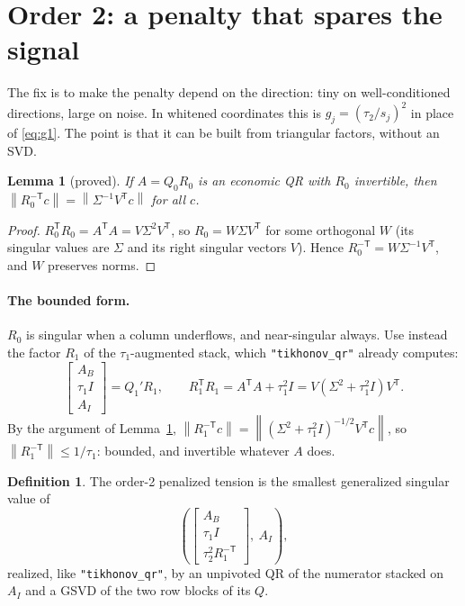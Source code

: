 \documentclass[11pt]{article}
\newtheorem{lemma}{Lemma}
\theoremstyle{definition}
\newtheorem{definition}{Definition}
\theoremstyle{remark}
\newcommand{\code}[1]{\texttt{#1}}
\newcommand{\norm}[1]{\left\lVert #1 \right\rVert}
\newcommand{\AB}{A_B}
\newcommand{\AI}{A_I}
\begin{document}
\section{Order 2: a penalty that spares the signal}

The fix is to make the penalty depend on the direction: tiny on well-conditioned directions,
large on noise. In whitened coordinates this is $g_j = (\tau_2/s_j)^2$ in place of
\eqref{eq:g1}. The point is that it can be built from triangular factors, without an SVD.

\begin{lemma}[proved]\label{lem:rinvt}
If $A = Q_0R_0$ is an economic QR with $R_0$ invertible, then
$\norm{R_0^{-\mathsf T}c} = \norm{\Sigma^{-1}V^{\mathsf T}c}$ for all $c$.
\end{lemma}
\begin{proof}
$R_0^{\mathsf T}R_0 = A^{\mathsf T}A = V\Sigma^2V^{\mathsf T}$, so $R_0 = W\Sigma V^{\mathsf T}$ for
some orthogonal $W$ (its singular values are $\Sigma$ and its right singular vectors $V$). Hence
$R_0^{-\mathsf T} = W\Sigma^{-1}V^{\mathsf T}$, and $W$ preserves norms.
\end{proof}

\paragraph{The bounded form.} $R_0$ is singular when a column underflows, and near-singular
always. Use instead the factor $R_1$ of the $\tau_1$-augmented stack, which \code{"tikhonov\_qr"}
already computes:
\[
  \begin{bmatrix}\AB\\ \tau_1 I\\ \AI\end{bmatrix} = Q_1'R_1,\qquad
  R_1^{\mathsf T}R_1 = A^{\mathsf T}A + \tau_1^2 I = V(\Sigma^2 + \tau_1^2 I)V^{\mathsf T}.
\]
By the argument of Lemma~\ref{lem:rinvt},
$\norm{R_1^{-\mathsf T}c} = \norm{(\Sigma^2+\tau_1^2I)^{-1/2}V^{\mathsf T}c}$, so
$\norm{R_1^{-\mathsf T}}\le 1/\tau_1$: bounded, and invertible whatever $A$ does.

\begin{definition}
The order-2 penalized tension is the smallest generalized singular value of
\begin{equation}\label{eq:tik2}
  \left(\begin{bmatrix}\AB\\ \tau_1 I\\ \tau_2^2 R_1^{-\mathsf T}\end{bmatrix},\ \AI\right),
\end{equation}
realized, like \code{"tikhonov\_qr"}, by an unpivoted QR of the numerator stacked on $\AI$ and a
GSVD of the two row blocks of its $Q$.
\end{definition}
\end{document}
